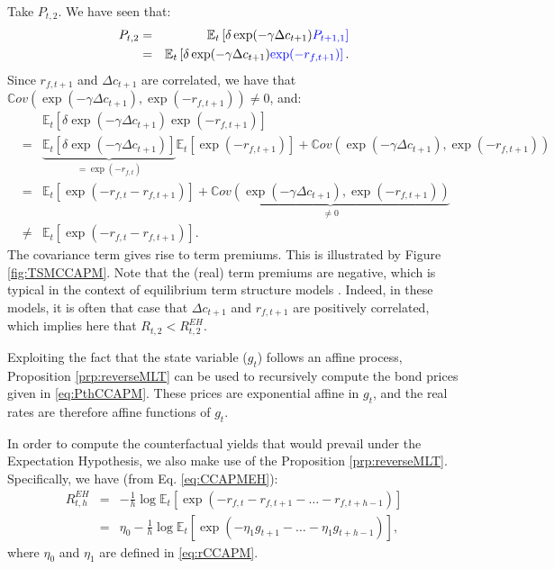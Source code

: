 \documentclass[
  12pt,
]{book}
\theoremstyle{definition}
\theoremstyle{definition}
\theoremstyle{definition}
\theoremstyle{definition}
\theoremstyle{remark}
\begin{document}
Take \(P_{t,2}\). We have seen that:
\begin{eqnarray*}
P_{t,2} &=&  \mathbb{E}_t \left[ \delta \exp(-\gamma \Delta c_{t+1}) \color{blue}{P_{t+1,1}} \right]\\
&=& \mathbb{E}_t \left[ \delta \exp(-\gamma \Delta c_{t+1}) \color{blue}{\exp(- r_{f,t+1})} \right].
\end{eqnarray*}
Since \(r_{f,t+1}\) and \(\Delta c_{t+1}\) are correlated, we have that \(\mathbb{C}ov(\exp(-\gamma \Delta c_{t+1}),\exp(- r_{f,t+1}))\ne 0\), and:
\begin{eqnarray*}
&&\mathbb{E}_t \left[ \delta \exp(-\gamma \Delta c_{t+1}) \exp(- r_{f,t+1}) \right]\\
&=& \underbrace{\mathbb{E}_t \left[ \delta \exp(-\gamma \Delta c_{t+1}) \right]}_{=\exp(-r_{f,t})}\mathbb{E}_t \left[ \exp(- r_{f,t+1}) \right] + \mathbb{C}ov(\exp(-\gamma \Delta c_{t+1}),\exp(- r_{f,t+1}))\\
&=& \mathbb{E}_t \left[ \exp(- r_{f,t}- r_{f,t+1}) \right] + \underbrace{\mathbb{C}ov(\exp(-\gamma \Delta c_{t+1}),\exp(- r_{f,t+1}))}_{\ne 0}\\
&\ne& \mathbb{E}_t \left[ \exp(- r_{f,t}- r_{f,t+1}) \right].
\end{eqnarray*}
The covariance term gives rise to term premiums. This is illustrated by Figure \ref{fig:TSMCCAPM}. Note that the (real) term premiums are negative, which is typical in the context of equilibrium term structure models \citep{Piazzesi_Schneider_2007}. Indeed, in these models, it is often that case that \(\Delta c_{t+1}\) and \(r_{f,t+1}\) are positively correlated, which implies here that \(R_{t,2} < R_{t,2}^{EH}\).

Exploiting the fact that the state variable (\(g_t\)) follows an affine process, Proposition \ref{prp:reverseMLT} can be used to recursively compute the bond prices given in \eqref{eq:PthCCAPM}. These prices are exponential affine in \(g_t\), and the real rates are therefore affine functions of \(g_t\).

In order to compute the counterfactual yields that would prevail under the Expectation Hypothesis, we also make use of the Proposition \ref{prp:reverseMLT}. Specifically, we have (from Eq. \eqref{eq:CCAPMEH}):
\begin{eqnarray}
R^{EH}_{t,h} &=& -\frac{1}{h} \log \mathbb{E}_t \left[ \exp(- r_{f,t} - r_{f,t+1} - \dots - r_{f,t+h-1}) \right] \\
&=& \eta_0 -\frac{1}{h} \log \mathbb{E}_t \left[ \exp(  - \eta_1 g_{t+1} - \dots - \eta_1 g_{t+h-1}) \right],
\end{eqnarray}
where \(\eta_0\) and \(\eta_1\) are defined in \eqref{eq:rCCAPM}.
\end{document}
